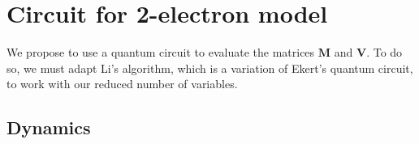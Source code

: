 \documentclass{aux/ttuthes2007}
\begin{document}

\section {\textbf{Circuit for 2-electron model}}

We propose to use a quantum circuit to evaluate the matrices $\bm M$ and $\bm V$. To do so, we must adapt Li's  algorithm, which is a variation of Ekert's  quantum circuit, to work with our reduced number of variables.
%
\subsection {\textbf{Dynamics}}
\end{document}

